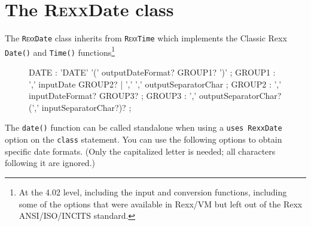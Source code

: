 \section{The R\textsc{exx}Date class}\label{refrexxdate}
 
The \texttt{R\textsc{exx}Date} class inherits from
\texttt{R\textsc{exx}Time} which implements the Classic
Rexx \texttt{Date()} and \texttt{Time()} functions\footnote{At the
  4.02 level, including the input and conversion functions, including
some of the options that were available in Rexx/VM but left out of the
Rexx ANSI/ISO/INCITS standard.}

\begin{figure}[h]
  \begin{shaded}
\begin{rail}
  DATE : 'DATE' '('   outputDateFormat? GROUP1?  ')'
  ;
  GROUP1 : ','  inputDate GROUP2?
  | ','  ','  outputSeparatorChar
  ;
  GROUP2 : ','  inputDateFormat? GROUP3?
  ;
  GROUP3 : ','  outputSeparatorChar? (',' inputSeparatorChar?)?
  ;
  
\end{rail}
\end{shaded}
\end{figure}

The \texttt{date()} function can be called standalone when using a \texttt{uses RexxDate} option on the \texttt{class} statement. You can use the following options to obtain specific date formats. (Only the capitalized letter is needed; all characters following it are ignored.)
